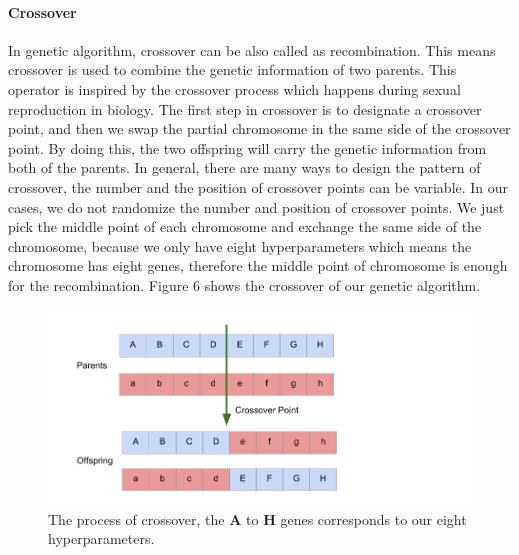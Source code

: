 \documentclass[12pt]{article}
\begin{document}
\paragraph{Crossover}
In genetic algorithm, crossover can be also called as recombination. This means crossover is used to combine the genetic information of two parents. This operator is inspired by the crossover process which happens during sexual reproduction in biology. The first step in crossover is to designate a crossover point, and then we swap the partial chromosome in the same side of the crossover point. By doing this, the two offspring will carry the genetic information from both of the parents. In general, there are many ways to design the pattern of crossover, the number and the position of crossover points can be variable. In our cases, we do not randomize the number and position of crossover points. We just pick the middle point of each chromosome and exchange the same side of the chromosome, because we only have eight hyperparameters which means the chromosome has eight genes, therefore the middle point of chromosome is enough for the recombination. Figure 6 shows the crossover of our genetic algorithm.\\
\begin{figure}
\begin{center}
\includegraphics[width =7.2in]{crossover.png}
\caption{The process of crossover, the \textbf{A} to \textbf{H} genes corresponds to our eight hyperparameters.}
\end{center}
\label{fig:pic6}
\end{figure}
\end{document}
